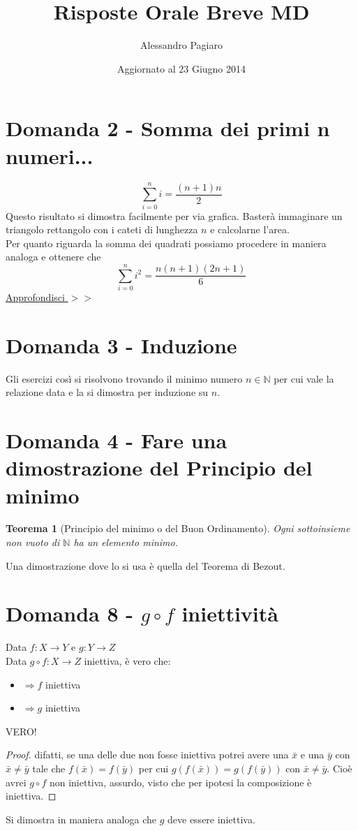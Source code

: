 \documentclass[]{article}
\begin{document}
\newcommand{\campo}[1]{\mathbb{#1}}
\newcommand{\minug}{\leqslant}
\newtheorem*{lem}{Teorema}
\newtheorem*{definizione}{Definizione}
\title{Risposte Orale Breve MD}
\author{Alessandro Pagiaro}
\date{Aggiornato al 23 Giugno 2014}
\maketitle
\tableofcontents
\clearpage
\section{Domanda 2 - Somma dei primi n numeri...}
$$\sum_{i=0}^n i = \frac{(n+1)n}{2}$$Questo risultato si dimostra facilmente per via grafica. Basterà immaginare un triangolo rettangolo con i cateti di lunghezza $n$ e calcolarne l'area.\\
Per quanto riguarda la somma dei quadrati possiamo procedere in maniera analoga e ottenere che $$\sum_{i=0}^n i^2  = \frac{n(n+1)(2n+1)}{6}$$
\href{http://www.batmath.it/matematica/avista/somma_quadr/somma_quadr.htm}{Approfondisci $>>$}\\
\section{Domanda 3 - Induzione}
Gli esercizi così si risolvono trovando il minimo numero $n \in \campo{N}$ per cui vale la relazione data e la si dimostra per induzione su $n$. 
\section{Domanda 4 - Fare una dimostrazione del Principio del minimo}
\begin{lem}[Principio del minimo o del Buon Ordinamento]
Ogni sottoinsieme non vuoto di $\campo{N}$ ha un elemento minimo.
\end{lem}
Una dimostrazione dove lo si usa è quella del Teorema di Bezout. 
\section{Domanda 8 - $g\circ f$ iniettività}
Data $f:X \rightarrow Y$ e $g: Y \rightarrow Z$\\
Data $g\circ f: X \rightarrow Z$ iniettiva, è vero che:
\begin{itemize}
\item $\Rightarrow f$ iniettiva
\item $\Rightarrow g$ iniettiva
\end{itemize}
VERO!
\begin{proof}
difatti, se una delle due non fosse iniettiva potrei avere una $\bar{x}$ e una $\bar{y}$ con $\bar{x} \not= \bar{y}$ tale che $f(\bar{x})=f(\bar{y})$ per cui $g(f(\bar{x}))=g(f(\bar{y}))$ con $\bar{x} \not= \bar{y}$. Cioè avrei $g\circ f$ non iniettiva, assurdo, visto che per ipotesi la composizione è iniettiva.
\end{proof}
Si dimostra in maniera analoga che $g$ deve essere iniettiva.
\end{document}
